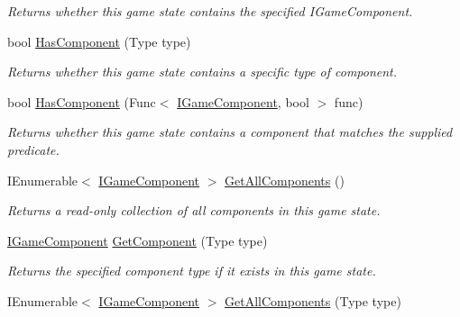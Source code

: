 \begin{DoxyCompactItemize}
\begin{DoxyCompactList}\small\item\em Returns whether this game state contains the specified I\-Game\-Component. \end{DoxyCompactList}\item 
bool \hyperlink{class_tri_devs_1_1_tri_engine_1_1_state_management_1_1_game_state_ad99d5734aa4af04f6895299f8df8e4a3}{Has\-Component} (Type type)
\begin{DoxyCompactList}\small\item\em Returns whether this game state contains a specific type of component. \end{DoxyCompactList}\item 
bool \hyperlink{class_tri_devs_1_1_tri_engine_1_1_state_management_1_1_game_state_a42df76ca0994638a2babbe1cdcd6ed27}{Has\-Component} (Func$<$ \hyperlink{interface_tri_devs_1_1_tri_engine_1_1_interfaces_1_1_i_game_component}{I\-Game\-Component}, bool $>$ func)
\begin{DoxyCompactList}\small\item\em Returns whether this game state contains a component that matches the supplied predicate. \end{DoxyCompactList}\item 
I\-Enumerable$<$ \hyperlink{interface_tri_devs_1_1_tri_engine_1_1_interfaces_1_1_i_game_component}{I\-Game\-Component} $>$ \hyperlink{class_tri_devs_1_1_tri_engine_1_1_state_management_1_1_game_state_ad712f453e6ba97f3cc634632e248c5be}{Get\-All\-Components} ()
\begin{DoxyCompactList}\small\item\em Returns a read-\/only collection of all components in this game state. \end{DoxyCompactList}\item 
\hyperlink{interface_tri_devs_1_1_tri_engine_1_1_interfaces_1_1_i_game_component}{I\-Game\-Component} \hyperlink{class_tri_devs_1_1_tri_engine_1_1_state_management_1_1_game_state_a0566cac8f85dbcaf9c98536114542a87}{Get\-Component} (Type type)
\begin{DoxyCompactList}\small\item\em Returns the specified component type if it exists in this game state. \end{DoxyCompactList}\item 
I\-Enumerable$<$ \hyperlink{interface_tri_devs_1_1_tri_engine_1_1_interfaces_1_1_i_game_component}{I\-Game\-Component} $>$ \hyperlink{class_tri_devs_1_1_tri_engine_1_1_state_management_1_1_game_state_ac605c0fefc54507ec2ccfef94fa2d9c2}{Get\-All\-Components} (Type type)

\end{DoxyCompactItemize}
